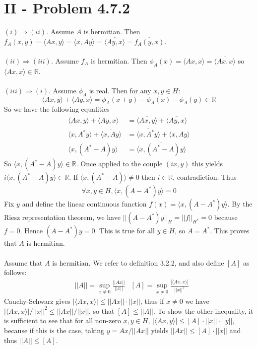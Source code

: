 \documentclass[11pt,a4paper]{article}
\newcommand{\R}{\mathbb{R}}
\newcommand{\1}{\mathbbm{1}}
\begin{document}
\section*{II - Problem 4.7.2}
$(i) \Rightarrow (ii)$. Assume $A$ is hermitian. Then $f_A(x,y) = \langle Ax, y \rangle = \langle x, Ay \rangle = \overline{\langle Ay , x \rangle} = \overline{ f_A(y,x) }$.\\\\
$(ii) \Rightarrow (iii)$. Assume $f_A$ is hermitian. Then $\phi_A(x) = \langle Ax, x \rangle = \overline{ \langle Ax , x \rangle}$ so $\langle Ax , x \rangle \in \R$.\\\\
$(iii) \Rightarrow (i)$. Assume $\phi_A$ is real. Then for any $x,y \in H$:
\[ \langle Ax , y \rangle + \langle Ay , x \rangle = \phi_A(x+y) - \phi_A(x) - \phi_A(y) \in \R \]
So we have the following equalities
\begin{align*}
\langle Ax , y \rangle + \langle Ay , x \rangle & = \overline{\langle Ax , y \rangle} + \overline{\langle Ay , x \rangle} \\ \langle x , A^* y \rangle + \overline{\langle x , A y \rangle} & = \overline{\langle x , A^* y \rangle} + \langle x , Ay \rangle \\
\langle x , (A^* - A) y \rangle & = \overline{\langle x , (A^*-A) y \rangle}
\end{align*}
So $\langle x , (A^* - A) y \rangle \in \R$. Once applied to the couple $(ix,y)$ this yields $i \langle x , (A^* - A)y \rangle \in \R$. If $\langle x , (A^* - A) \rangle \neq 0$ then $i \in \R$, contradiction. Thus
\[ \forall x,y \in H, \langle x, (A-A^*)y \rangle = 0 \]
Fix $y$ and define the linear continuous function $f(x) = \langle x , (A-A^*)y \rangle$. By the Riesz representation theorem, we have $||(A-A^*)y||_H = ||f||_{H^*} = 0$ because $f = 0$. Hence $(A-A^*)y = 0$. This is true for all $y \in H$, so $A = A^*$. This proves that $A$ is hermitian.\\\\
Assume that $A$ is hermitian. We refer to definition 3.2.2, and also define $[A]$ as follows:
\begin{align*} & ||A|| = \sup_{x \neq 0} \frac{||Ax||}{||x||} & [A] = \sup_{x \neq 0} \frac{|\langle Ax , x \rangle|}{||x||^2} \end{align*}
Cauchy-Schwarz gives $|\langle Ax , x \rangle| \leq ||Ax|| \cdot ||x||$, thus if $x \neq 0$ we have $|\langle Ax , x \rangle|/||x||^2 \leq ||Ax||/||x||$, so that $[A] \leq ||A||$. To show the other inequality, it is sufficient to see that for all non-zero $x,y \in H$, $|\langle Ax , y \rangle| \leq [A] \cdot ||x||\cdot||y||$, because if this is the case, taking $y = Ax/||Ax||$ yields $||Ax|| \leq [A]\cdot ||x||$ and thus $||A|| \leq [A]$.\\\\
\end{document}
